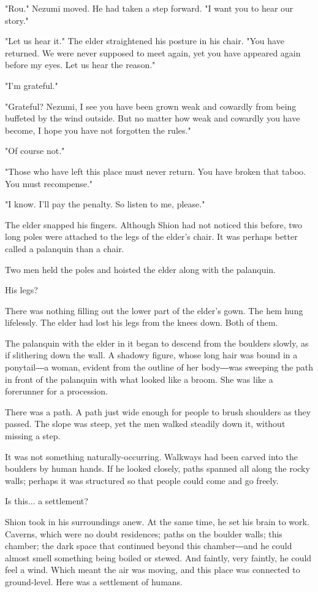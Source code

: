 "Rou." Nezumi moved. He had taken a step forward. "I want you to hear
our story."

"Let us hear it." The elder straightened his posture in his chair. "You
have returned. We were never supposed to meet again, yet you have
appeared again before my eyes. Let us hear the reason."

"I'm grateful."

"Grateful? Nezumi, I see you have been grown weak and cowardly from
being buffeted by the wind outside. But no matter how weak and cowardly
you have become, I hope you have not forgotten the rules."

"Of course not."

"Those who have left this place must never return. You have broken that
taboo. You must recompense."

"I know. I'll pay the penalty. So listen to me, please."

The elder snapped his fingers. Although Shion had not noticed this
before, two long poles were attached to the legs of the elder's chair.
It was perhaps better called a palanquin than a chair.

Two men held the poles and hoisted the elder along with the palanquin.

His legs?

There was nothing filling out the lower part of the elder's gown. The
hem hung lifelessly. The elder had lost his legs from the knees down.
Both of them.

The palanquin with the elder in it began to descend from the boulders
slowly, as if slithering down the wall. A shadowy figure, whose long
hair was bound in a ponytail―a woman, evident from the outline of her
body―was sweeping the path in front of the palanquin with what looked
like a broom. She was like a forerunner for a procession.

There was a path. A path just wide enough for people to brush shoulders
as they passed. The slope was steep, yet the men walked steadily down
it, without missing a step.

It was not something naturally-occurring. Walkways had been carved into
the boulders by human hands. If he looked closely, paths spanned all
along the rocky walls; perhaps it was structured so that people could
come and go freely.

Is this... a settlement?

Shion took in his surroundings anew. At the same time, he set his brain
to work. Caverns, which were no doubt residences; paths on the boulder
walls; this chamber; the dark space that continued beyond this
chamber―and he could almost smell something being boiled or stewed. And
faintly, very faintly, he could feel a wind. Which meant the air was
moving, and this place was connected to ground-level. Here was a
settlement of humans.

